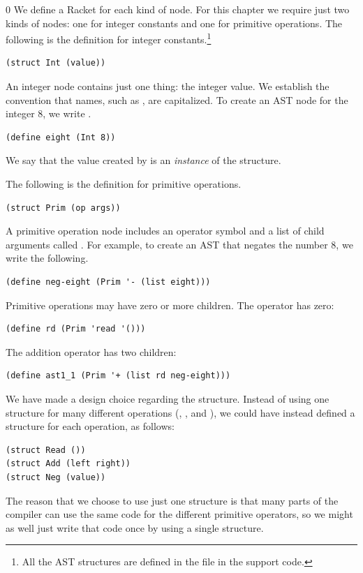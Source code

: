\documentclass[7x10]{TimesAPriori_MIT}%
\def\racketEd{0}
\def\edition{0}
\numberwithin{theorem}{chapter}
\numberwithin{definition}{chapter}
\numberwithin{equation}{chapter}
\begin{document}
{\if\edition\racketEd
We define a Racket  for each kind of node.  For this
chapter we require just two kinds of nodes: one for integer constants
and one for primitive operations.  The following is the 
definition for integer constants.\footnote{All the AST structures are
defined in the file  in the support code.}
\begin{lstlisting}
(struct Int (value))
\end{lstlisting}
An integer node contains just one thing: the integer value.
We establish the convention that  names, such
as , are capitalized.
To create an AST node for the integer $8$, we write .
\begin{lstlisting}
(define eight (Int 8))
\end{lstlisting}
We say that the value created by  is an
\emph{instance} of the
 structure.

The following is the  definition for primitive operations.
\begin{lstlisting}
(struct Prim (op args))
\end{lstlisting}
A primitive operation node includes an operator symbol  and a
list of child arguments called . For example, to create an
AST that negates the number $8$, we write the following.
\begin{lstlisting}
(define neg-eight (Prim '- (list eight)))
\end{lstlisting}
Primitive operations may have zero or more children. The 
operator has zero:
\begin{lstlisting}
(define rd (Prim 'read '()))
\end{lstlisting}
The addition operator has two children:
\begin{lstlisting}
(define ast1_1 (Prim '+ (list rd neg-eight)))
\end{lstlisting}

We have made a design choice regarding the  structure.
Instead of using one structure for many different operations
(, \code{+}, and \code{-}), we could have instead defined a
structure for each operation, as follows:
\begin{lstlisting}
(struct Read ())
(struct Add (left right))
(struct Neg (value))
\end{lstlisting}
The reason that we choose to use just one structure is that many parts
of the compiler can use the same code for the different primitive
operators, so we might as well just write that code once by using a
single structure.
%
\fi}
\end{document}
